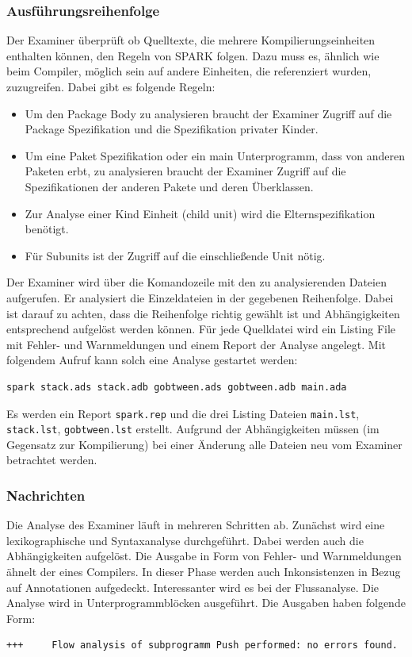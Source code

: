\subsubsection{Ausführungsreihenfolge}
Der Examiner überprüft ob Quelltexte, die mehrere Kompilierungseinheiten enthalten können, den Regeln von SPARK folgen. Dazu muss es, ähnlich wie beim Compiler, möglich sein auf andere Einheiten, die referenziert wurden, zuzugreifen. Dabei gibt es folgende Regeln:

\begin{itemize}
\item Um den Package Body zu analysieren braucht der Examiner Zugriff auf die Package Spezifikation und die Spezifikation privater Kinder.
\item Um eine Paket Spezifikation oder ein main Unterprogramm, dass von anderen Paketen erbt, zu analysieren braucht der Examiner Zugriff auf die Spezifikationen der anderen Pakete und deren Überklassen.
\item Zur Analyse einer Kind Einheit (child unit) wird die Elternspezifikation benötigt.
\item Für Subunits ist der Zugriff auf die einschließende Unit nötig. 
\end{itemize}
Der Examiner wird über die Komandozeile mit den zu analysierenden Dateien aufgerufen. Er analysiert die Einzeldateien in der gegebenen Reihenfolge. Dabei ist darauf zu achten, dass die Reihenfolge richtig gewählt ist und Abhängigkeiten entsprechend aufgelöst werden können. Für jede Quelldatei wird ein Listing File mit Fehler- und Warnmeldungen und einem Report der Analyse angelegt.
Mit folgendem Aufruf kann solch eine Analyse gestartet werden:
\begin{verbatim}
spark stack.ads stack.adb gobtween.ads gobtween.adb main.ada
\end{verbatim}
Es werden ein Report \texttt{spark.rep} und die drei Listing Dateien \texttt{main.lst},  
\texttt{stack.lst}, \texttt{gobtween.lst} erstellt.
Aufgrund der Abhängigkeiten müssen (im Gegensatz zur Kompilierung) bei einer Änderung alle Dateien neu vom Examiner betrachtet werden.

\subsubsection{Nachrichten}
Die Analyse des Examiner läuft in mehreren Schritten ab. Zunächst wird eine lexikographische und Syntaxanalyse durchgeführt. Dabei werden auch die Abhängigkeiten aufgelöst. Die Ausgabe in Form von Fehler- und Warnmeldungen ähnelt der eines Compilers. In dieser Phase werden auch Inkonsistenzen in Bezug auf Annotationen aufgedeckt.
Interessanter wird es bei der Flussanalyse. Die Analyse wird in Unterprogrammblöcken ausgeführt.
Die Ausgaben haben folgende Form:
\begin{verbatim}
+++		Flow analysis of subprogramm Push performed: no errors found.
\end{verbatim}

